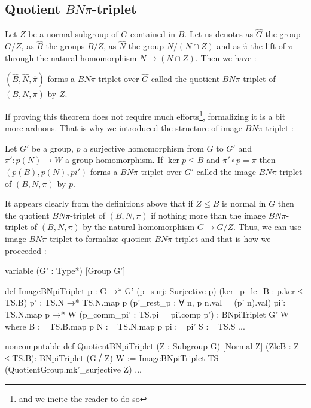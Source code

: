 \subsection{Quotient $BN\pi$-triplet}

    Let $Z$ be a normal subgroup of $G$ contained in $B$. Let us denotes as $\hat{G}$ the group $G /Z$, as $\hat{B}$ the groups $B/{Z}$, as $\hat{N}$ the group $N/(N\cap Z)$ and as $\hat{\pi}$ the lift of $\pi$ through the natural homomorphism $N \to (N \cap Z)$. Then we have :

\begin{definition} \label{def:quotBN}
$\left( \hat{B},\hat{N},\hat{\pi} \right)$ forms a $BN\pi$-triplet over $\hat{G}$ called the quotient $BN\pi$-triplet of $\left( B,N, \pi \right)$ by $Z$.
\end{definition}

 If proving this theorem does not require much efforts\footnote{and we incite the reader to do so}, formalizing it is a bit more arduous. That is why we introduced the structure of image $BN\pi$-triplet :

\begin{definition}
Let $G'$ be a group, $p$ a surjective homomorphism from $G$ to $G'$ and $\pi': p(N) \to W$ a group homomorphism. If $\ker p \le B$ and $\pi' \circ p = \pi$ then $\left( p(B), p(N), pi' \right)$  forms a $BN\pi$-triplet over $G'$ called the image $BN\pi$-triplet of $(B,N, \pi)$ by $p$.
\end{definition}

It appears clearly from the definitions above that if $Z \le B$ is normal in $G$ then the quotient $BN\pi$-triplet of $\left( B,N, \pi \right)$ if nothing more than the image $BN\pi$-triplet of $\left( B,N, \pi \right)$ by the natural homomorphism $G \to G / Z$. Thus, we can use image $BN\pi$-triplet to formalize quotient $BN\pi$-triplet and that is how we proceeded :

\begin{leancode}
variable (G' : Type*) [Group G']

def ImageBNpiTriplet {p : G →* G'} (p_surj: Surjective p) (ker_p_le_B : p.ker ≤ TS.B)
    {p' : TS.N →* TS.N.map p} (p'_rest_p : ∀ n, p n.val = (p' n).val) {pi': TS.N.map p →* W}
      (p_comm_pi' : TS.pi = pi'.comp p') : BNpiTriplet G' W where
  B := TS.B.map p
  N := TS.N.map p
  pi := pi'
  S := TS.S
  ...

noncomputable
def QuotientBNpiTriplet (Z : Subgroup G) [Normal Z] (ZleB : Z ≤ TS.B): BNpiTriplet (G ⧸ Z) W :=
    ImageBNpiTriplet TS (QuotientGroup.mk'_surjective Z) ...
\end{leancode}

